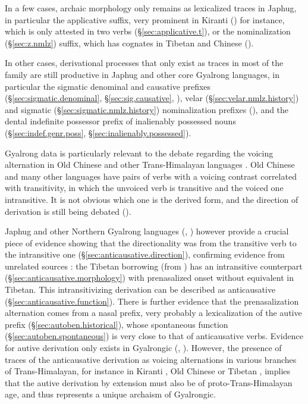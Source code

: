 In a few cases, archaic morphology only remains as lexicalized traces in Japhug, in particular the applicative  suffix, very prominent in Kiranti (\citealt{michailovsky85dental, jacques15derivational.khaling}) for instance, which is only attested in two verbs (§\ref{sec:applicative.t}), or the nominalization  (§\ref{sec:z.nmlz}) suffix, which has cognates in Tibetan and Chinese (\citealt{jacques03s.houzhui, jacques16ssuffixes}).

In other cases,  derivational processes that only exist as traces in most of the family are still productive in Japhug and other core Gyalrong languages, in particular the sigmatic denominal and causative prefixes (§\ref{sec:sigmatic.denominal}, §\ref{sec:sig.causative}, \citealt{sagart12sprefix, jacques15causative}),  velar (§\ref{sec:velar.nmlz.history}) and sigmatic (§\ref{sec:sigmatic.nmlz.history}) nominalization prefixes (\citealt{jacques14snom, konnerth16gV, jacques18oc-nmlz}), and the dental indefinite possessor prefix of inalienably possessed nouns (§\ref{sec:indef.genr.poss}, §\ref{sec:inalienably.possessed}).

Gyalrong data is particularly relevant to the debate regarding the voicing alternation in Old Chinese and other Trans-Himalayan languages
\citep{handel12valence}. Old Chinese and many other languages have pairs of verbs with a voicing contrast correlated with transitivity, in which the unvoiced verb is transitive and the voiced one intransitive. It is not obvious which one is the derived form, and the direction of derivation is still being debated (\citealt{sagart12sprefix, mei12caus}). 

Japhug and other Northern Gyalrong languages  (\citealt[411--412]{jacques04these}, \citealt[271]{gong18these}) however provide a crucial piece of evidence showing that the directionality was from the transitive verb to the intransitive one (§\ref{sec:anticausative.direction}), confirming evidence from unrelated sources \citep{sagart03prenasalized}: the Tibetan borrowing  (from ) has an intransitive counterpart  (§\ref{sec:anticausative.morphology}) with prenasalized onset without equivalent in Tibetan. This intransitivizing derivation can be described as anticausative (§\ref{sec:anticausative.function}). There is further evidence that the prenasalization alternation comes from a nasal prefix, very probably a lexicalization of the   autive  prefix (§\ref{sec:autoben.historical}), whose spontaneous function (§\ref{sec:autoben.spontaneous}) is very close to that of anticausative verbs. Evidence for autive derivation only exists in Gyalrongic (\citealt[357--368]{lai17khroskyabs}, \citealt{gong18these}). However, the presence of traces of the anticausative derivation as voicing alternations in various branches of Trans-Himalayan, for instance in Kiranti \citep{jacques15derivational.khaling}, Old Chinese \citep{sagart12sprefix} or Tibetan \citep{jacques12internal}, implies that the autive derivation by extension must also be of proto-Trans-Himalayan age, and thus represents a unique archaism of Gyalrongic.
 

